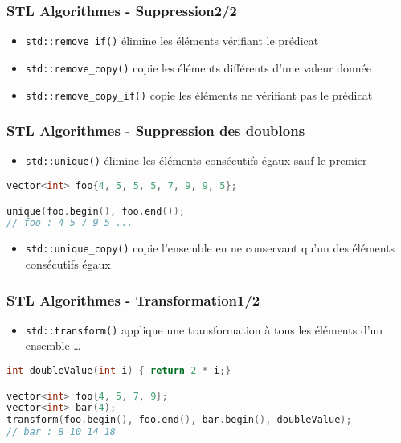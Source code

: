 \documentclass[C++.tex]{subfiles}
\begin{document}
\begin{frame}[fragile]
	\frametitle{STL Algorithmes - Suppression\titlehfill{}2/2}
	\begin{itemize}
		\item \lstinline|std::remove_if()| \og élimine\fg{} les éléments vérifiant le prédicat
		\item \lstinline|std::remove_copy()| copie les éléments différents d'une valeur donnée
		\item \lstinline|std::remove_copy_if()| copie les éléments ne vérifiant pas le prédicat
	\end{itemize}
\end{frame}

\begin{frame}[fragile]
	\frametitle{STL Algorithmes - Suppression des doublons}
	\begin{itemize}
		\item \lstinline|std::unique()| \og élimine\fg{} les éléments consécutifs égaux sauf le premier
	\end{itemize}


	\begin{lstlisting}[language=C++]
vector<int> foo{4, 5, 5, 5, 7, 9, 9, 5};

unique(foo.begin(), foo.end());
// foo : 4 5 7 9 5 ... \end{lstlisting}

	\begin{itemize}
		\item \lstinline|std::unique_copy()| copie l'ensemble en ne conservant qu'un des éléments consécutifs égaux
	\end{itemize}
\end{frame}

\begin{frame}[fragile]
	\frametitle{STL Algorithmes - Transformation\titlehfill{}1/2}
	\begin{itemize}
		\item \lstinline|std::transform()| applique une transformation à tous les éléments d'un ensemble \ldots
	\end{itemize}

	\begin{lstlisting}[language=C++]
int doubleValue(int i) { return 2 * i;}

vector<int> foo{4, 5, 7, 9};
vector<int> bar(4);
transform(foo.begin(), foo.end(), bar.begin(), doubleValue);
// bar : 8 10 14 18\end{lstlisting}
\end{frame}
\end{document}
